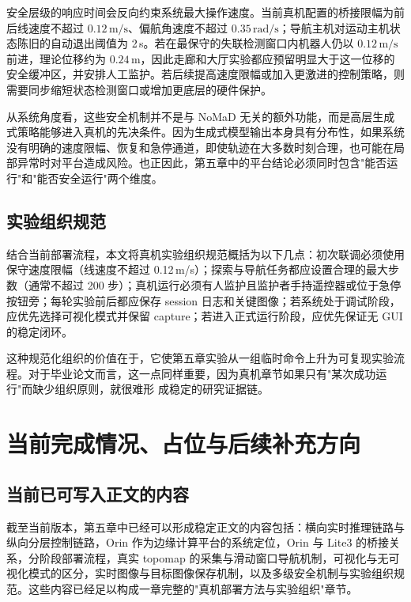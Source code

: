 安全层级的响应时间会反向约束系统最大操作速度。当前真机配置的桥接限幅为前后线速度不超过 $0.12\,\text{m/s}$、偏航角速度不超过 $0.35\,\text{rad/s}$；导航主机对运动主机状态陈旧的自动退出阈值为 2\,s。若在最保守的失联检测窗口内机器人仍以 $0.12\,\text{m/s}$ 前进，理论位移约为 $0.24\,\text{m}$，因此走廊和大厅实验都应预留明显大于这一位移的安全缓冲区，并安排人工监护。若后续提高速度限幅或加入更激进的控制策略，则需要同步缩短状态检测窗口或增加更底层的硬件保护。

从系统角度看，这些安全机制并不是与 NoMaD 无关的额外功能，而是高层生成式策略能够进入真机的先决条件\cite{diffusionpolicy2023,hwangbo2019anymal,lee2020learning}。因为生成式模型输出本身具有分布性，如果系统没有明确的速度限幅、恢复和急停通道，即使轨迹在大多数时刻合理，也可能在局
部异常时对平台造成风险。也正因此，第五章中的平台结论必须同时包含"能否运行"和"能否安全运行"两个维度。

\subsection{实验组织规范}

结合当前部署流程，本文将真机实验组织规范概括为以下几点：初次联调必须使用保守速度限幅（线速度不超过 0.12\,m/s）；探索与导航任务都应设置合理的最大步数（通常不超过
200 步）；真机运行必须有人监护且监护者手持遥控器或位于急停按钮旁；每轮实验前后都应保存 session 日志和关键图像；若系统处于调试阶段，应优先选择可视化模式并保留
capture；若进入正式运行阶段，应优先保证无 GUI 的稳定闭环。

这种规范化组织的价值在于，它使第五章实验从一组临时命令上升为可复现实验流程。对于毕业论文而言，这一点同样重要，因为真机章节如果只有"某次成功运行"而缺少组织原则，就很难形
成稳定的研究证据链。

\section{当前完成情况、占位与后续补充方向}

\subsection{当前已可写入正文的内容}

截至当前版本，第五章中已经可以形成稳定正文的内容包括：横向实时推理链路与纵向分层控制链路，Orin 作为边缘计算平台的系统定位，Orin 与 Lite3 的桥接关系，分阶段部署流程，真实 topomap 的采集与滑动窗口导航机制，可视化与无可视化模式的区分，实时图像与目标图像保存机制，以及多级安全机制与实验组织规范。这些内容已经足以构成一章完整的"真机部署方法与实验组织"章节。

